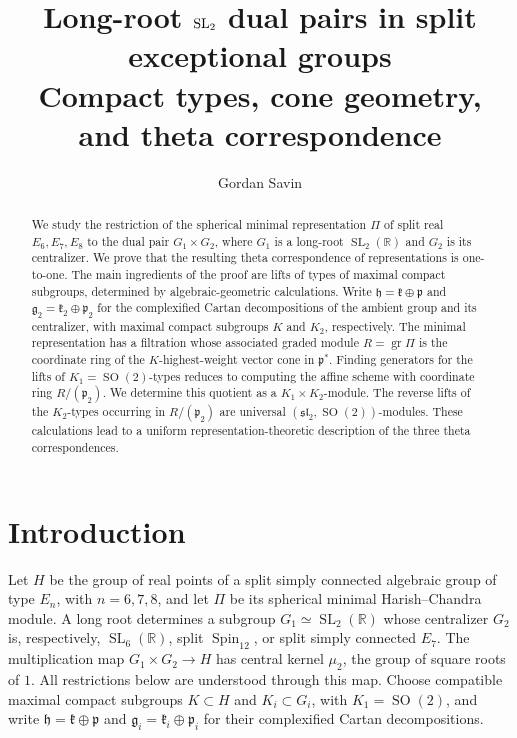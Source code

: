 \documentclass[11pt]{article}
\title{Long-root $\SL_2$ dual pairs in split exceptional groups\\
\large Compact types, cone geometry, and theta correspondence}
\author{Gordan Savin}
\date{}
\newcommand{\R}{\mathbb R}
\newcommand{\gr}{\operatorname{gr}}
\newcommand{\SL}{\operatorname{SL}}
\newcommand{\SO}{\operatorname{SO}}
\newcommand{\Spin}{\operatorname{Spin}}
\newcommand{\fg}{\mathfrak g}
\newcommand{\fk}{\mathfrak k}
\newcommand{\fp}{\mathfrak p}
\newcommand{\fh}{\mathfrak h}
\theoremstyle{definition}
\numberwithin{equation}{section}
\begin{document}
\maketitle
\begin{abstract}
We study the restriction of the spherical minimal representation $\Pi$
of split real $E_6,E_7,E_8$ to the dual pair $G_1\times G_2$, where
$G_1$ is a long-root $\SL_2(\R)$ and $G_2$ is its centralizer.
We prove that the resulting theta correspondence of representations
is one-to-one. The main ingredients of the proof are lifts of types
of maximal compact subgroups, determined by algebraic-geometric
calculations. Write $\fh=\fk\oplus\fp$ and
$\fg_2=\fk_2\oplus\fp_2$ for the complexified Cartan decompositions
of the ambient group and its centralizer, with maximal compact
subgroups $K$ and $K_2$, respectively. The minimal representation has
a filtration whose associated graded module $R=\gr\Pi$ is the
coordinate ring of the $K$-highest-weight vector cone in $\fp^*$.
Finding generators for the lifts of $K_1=\SO(2)$-types reduces to
computing the affine scheme with coordinate ring $R/(\fp_2)$.
We determine this quotient as a $K_1\times K_2$-module.
The reverse lifts of the $K_2$-types occurring in $R/(\fp_2)$ are
universal $(\mathfrak{sl}_2,\SO(2))$-modules. These calculations lead
to a uniform representation-theoretic description of the three theta
correspondences.
\end{abstract}
\begingroup
\renewcommand{\thefootnote}{}
\endgroup

\section{Introduction}\label{sec:intro}
Let $H$ be the group of real points of a split simply connected algebraic
group of type $E_n$, with $n=6,7,8$, and let $\Pi$ be its spherical minimal
Harish--Chandra module. A long root determines a subgroup
$G_1\simeq\SL_2(\R)$ whose centralizer $G_2$ is, respectively,
$\SL_6(\R)$, split $\Spin_{12}$, or split simply connected $E_7$.
The multiplication map $G_1\times G_2\to H$ has central kernel
$\mu_2$, the group of square roots of $1$. All restrictions below
are understood through this map. Choose compatible maximal compact subgroups
$K\subset H$ and $K_i\subset G_i$, with $K_1=\SO(2)$, and write
$\fh=\fk\oplus\fp$ and $\fg_i=\fk_i\oplus\fp_i$ for their
complexified Cartan decompositions.
\end{document}
